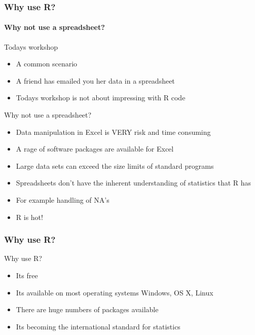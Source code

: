\documentclass{article}\usepackage[]{graphicx}\usepackage[]{color}
\begin{document}
\begin{frame}
  \frametitle{Why use R?}
  \framesubtitle{Why not use a spreadsheet?}

\begin{block}{Todays workshop}
\begin{itemize}
\item A common scenario
\item A friend has emailed you her data in a spreadsheet
\item Todays workshop is not about impressing with R code
\end{itemize}

\end{block}
  \begin{block}{Why not use a spreadsheet?}
  \begin{itemize}
    \item Data manipulation in Excel is VERY risk and time consuming
    \item A rage of software packages are available for Excel
    \item Large data sets can exceed the size limits of standard programs
    \item Spreadsheets don't have the inherent understanding of statistics that R has
    \item For example handling of N\/A's
    \item R is hot!
  \end{itemize}
  \end{block}
\end{frame}

\begin{frame}
  \frametitle{Why use R?}
  \begin{block}{Why use R?}
  \begin{itemize}
    \item Its free
    \item Its available on most operating systems Windows, OS X, Linux
    \item There are huge numbers of packages available
    \item Its becoming the international standard for statistics
  \end{itemize}
  \end{block}
\end{frame}

\end{document}
